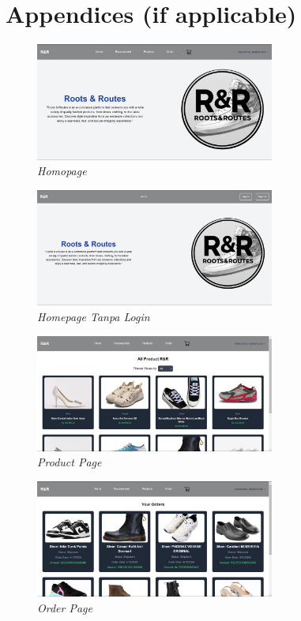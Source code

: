 \documentclass[journal,article,submit,pdftex,moreauthors]{Definitions/mdpi}
\begin{document}
\section{Appendices (if applicable)}
\begin{figure}[H]
    \centering
    \includegraphics[width=0.7\textwidth]{images/Homepage.jpeg}
    \captionsetup{justification=centering}
    \caption{\textit{Homopage}}
    \label{fig:activity-login}
\end{figure}
\begin{figure}[H]
    \centering
    \includegraphics[width=0.7\textwidth]{images/homepageNoLogin.jpeg}
    \captionsetup{justification=centering}
    \caption{\textit{Homepage Tanpa Login}}
    \label{fig:activity-login}
\end{figure}
\begin{figure}[H]
    \centering
    \includegraphics[width=0.7\textwidth]{images/productPage.jpeg}
    \captionsetup{justification=centering}
    \caption{\textit{Product Page}}
    \label{fig:activity-login}
\end{figure}
\begin{figure}[H]
    \centering
    \includegraphics[width=0.7\textwidth]{images/orderPage.jpeg}
    \captionsetup{justification=centering}
    \caption{\textit{Order Page}}
    \label{fig:activity-login}
\end{figure}
\end{document}
